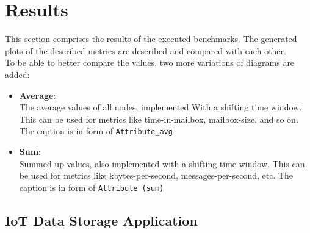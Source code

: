 \section{Results}
This section comprises the results of the executed benchmarks.
The generated plots of the described metrics are described and compared with each other.\\

To be able to better compare the values, two more variations of diagrams are added:
\begin{itemize}
    \item \textbf{Average}:\\
        The average values of all nodes, implemented With a shifting time window.
        This can be used for metrics like time-in-mailbox, mailbox-size, and so on.
        The caption is in form of \verb|Attribute_avg|
    \item \textbf{Sum}:\\
        Summed up values, also implemented with a shifting time window.
        This can be used for metrics like kbytes-per-second, messages-per-second, etc.
        The caption is in form of \verb|Attribute (sum)|
\end{itemize}


\newcommand{\plot}[3]{ \plotsize{#1}{#2}{#3}{0.30} }
\newcommand{\plotsize}[4]{
\begin{figure}[h]
  \centering
  \texttt{[image: img/results/\#1]}
    \caption{#3}
  \label{fig:#2}
\end{figure}
}

\subsection{IoT Data Storage Application}
